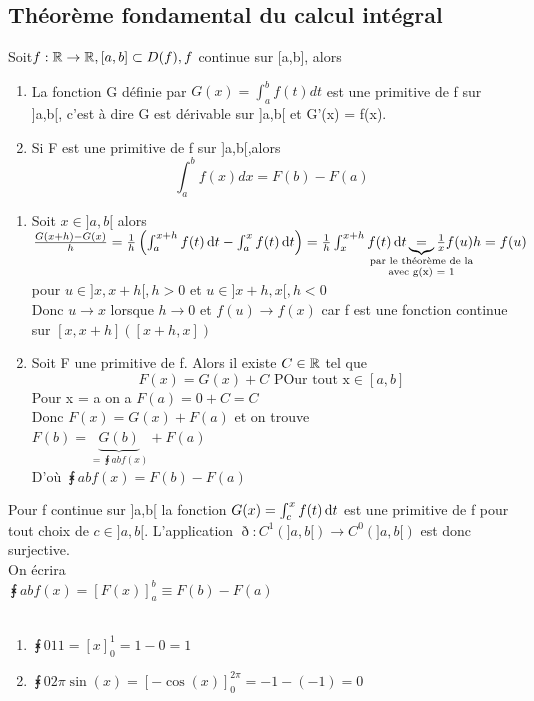 \documentclass[12pt,a4paper]{article}
\begin{document}
{\subsection{Théorème fondamental du calcul intégral}
\begin{boite}
	\Theoreme Soit$f:\mathbb{R} \to \mathbb{R}, [a,b] \subset D(f), f$ continue sur [a,b], alors
	\begin{enumerate}
		\item La fonction G définie par $G(x) = \int_a^b f(t) dt$ est une primitive de f sur ]a,b[, c'est à dire G est dérivable sur ]a,b[ et G'(x) = f(x).
		\item Si F est une primitive de f sur ]a,b[,alors 
		\begin{equation}
			\int_a^b f(x) dx = F(b) - F(a)
		\end{equation}
			\end{enumerate}
\end{boite}
\begin{enumerate}[label = \roman*)]
	 \item Soit $x \in ]a,b[$ alors
$
	 	\frac{G(x+h) - G(x)}{h} = \frac{1}{h}\left(\intt{a}{x+h}{f(t)} - \intt{a}{x}{f(t)}\right) = \\
	 	\frac{1}{h}\intt{x}{x+h}{f(t)} \underbrace{=}_{\mathclap{\substack{\text{par le théorème de la}\\ \text{avec g(x) = 1}}}} \frac{1}{x} f(u) h = f(u)
$
	 pour $u \in ]x,x+h[, h > 0$ et $u \in ]x+h,x[, h < 0$\\
	 Donc $ u \to x$ lorsque $h \to 0$ et $f(u) \to f(x)$ car f est une fonction continue sur $[x,x+h] ([x+h,x])$
	 \item Soit F une primitive de f. Alors il existe $C \in \mathbb{R}$ tel que
	 \begin{equation}
	 	F(x) = G(x) + C \text{ POur tout x} \in [a,b]
	 \end{equation}
	 Pour x = a on a $F(a) = 0+C = C$\\
	 Donc $F(x) = G(x) + F(a)$ et on trouve \\
	 $F(b) = \underbrace{G(b)}_{=\intx{a}{b}{f(x)}} + F(a)$\\
	 D'où $\intx{a}{b}{f(x)} = F(b) - F(a)$
\end{enumerate} 
 Pour f continue sur ]a,b[ la fonction $G(x) = \int_{c}^{x} f(t) \, \mathrm d t$ est une primitive de f pour tout choix de $c \in ]a,b[$. L'application $\eth : C^1(]a,b[) \to C^0(]a,b[)$ est donc surjective.\\
 On écrira\\
$\intx{a}{b}{f(x)} = \left[F(x)\right]_a^b \equiv F(b) - F(a)$\\
\\
\begin{enumerate}[label=\arabic*)]
	\item $\intx{0}{1}{1} = \left[x\right]_0^1 = 1-0 = 1$
	\item $\intx{0}{2\pi}{\sin(x)} = \left[-\cos(x)\right]_0^{2\pi} = -1-(-1) = 0$
\end{enumerate}
\newpage
}
\end{document}
